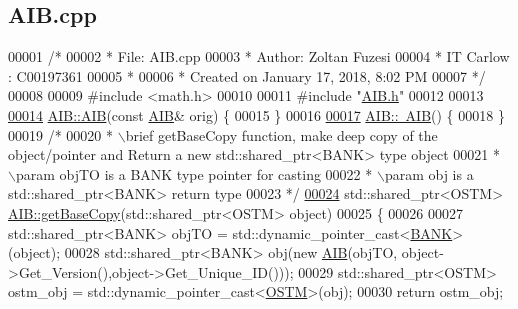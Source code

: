 \hypertarget{_a_i_b_8cpp_source}{}\subsection{A\+I\+B.\+cpp}

\begin{DoxyCode}
00001 \textcolor{comment}{/* }
00002 \textcolor{comment}{ * File:   AIB.cpp}
00003 \textcolor{comment}{ * Author: Zoltan Fuzesi}
00004 \textcolor{comment}{ * IT Carlow : C00197361}
00005 \textcolor{comment}{ *}
00006 \textcolor{comment}{ * Created on January 17, 2018, 8:02 PM}
00007 \textcolor{comment}{ */}
00008 
00009 \textcolor{preprocessor}{#include <math.h>}
00010 
00011 \textcolor{preprocessor}{#include "\hyperlink{_a_i_b_8h}{AIB.h}"}
00012 
00013 
\hypertarget{_a_i_b_8cpp_source.tex_l00014}{}\hyperlink{class_a_i_b_ab13d0db3498d59dbe6a946c469587c55_ab13d0db3498d59dbe6a946c469587c55}{00014} \hyperlink{class_a_i_b_a4783110463bf12f937a85b62455faf38_a4783110463bf12f937a85b62455faf38}{AIB::AIB}(\textcolor{keyword}{const} \hyperlink{class_a_i_b}{AIB}& orig) \{
00015 \}
00016 
\hypertarget{_a_i_b_8cpp_source.tex_l00017}{}\hyperlink{class_a_i_b_a22b11c50b0986326c86315957528bf79_a22b11c50b0986326c86315957528bf79}{00017} \hyperlink{class_a_i_b_a22b11c50b0986326c86315957528bf79_a22b11c50b0986326c86315957528bf79}{AIB::~AIB}() \{
00018 \}
00019 \textcolor{comment}{/*}
00020 \textcolor{comment}{ * \(\backslash\)brief getBaseCopy function, make deep copy of the object/pointer and Return a new std::shared\_ptr<BANK>
       type object}
00021 \textcolor{comment}{ * \(\backslash\)param objTO is a BANK type pointer for casting}
00022 \textcolor{comment}{ * \(\backslash\)param obj is a std::shared\_ptr<BANK> return type}
00023 \textcolor{comment}{ */}
\hypertarget{_a_i_b_8cpp_source.tex_l00024}{}\hyperlink{class_a_i_b_a987107f3d7a04790f84c1e7eeee37575_a987107f3d7a04790f84c1e7eeee37575}{00024} std::shared\_ptr<OSTM> \hyperlink{class_a_i_b_a987107f3d7a04790f84c1e7eeee37575_a987107f3d7a04790f84c1e7eeee37575}{AIB::getBaseCopy}(std::shared\_ptr<OSTM> \textcolor{keywordtype}{object})
00025 \{
00026 
00027     std::shared\_ptr<BANK> objTO = std::dynamic\_pointer\_cast<\hyperlink{class_b_a_n_k}{BANK}>(object);
00028     std::shared\_ptr<BANK> obj(\textcolor{keyword}{new} \hyperlink{class_a_i_b_a4783110463bf12f937a85b62455faf38_a4783110463bf12f937a85b62455faf38}{AIB}(objTO, object->Get\_Version(),\textcolor{keywordtype}{object}->Get\_Unique\_ID()));
00029     std::shared\_ptr<OSTM> ostm\_obj = std::dynamic\_pointer\_cast<\hyperlink{class_o_s_t_m}{OSTM}>(obj);
00030     \textcolor{keywordflow}{return} ostm\_obj;

\end{DoxyCode}
